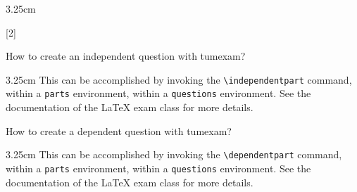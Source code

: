 \documentclass[english, @CLASSOPTIONS@]{tumexam}
\begin{document}
\begin{questions}
\begin{parts}
\begin{solutionbox}{3.25cm}
    \end{solutionbox}
  \end{parts}
  \clearpage
  [2]
  \begin{parts}
    \independentpart
    How to create an independent question with tumexam?
    \begin{solutionbox}{3.25cm}
      This can be accomplished by invoking the \texttt{\textbackslash{independentpart}} command, within a \texttt{parts} environment, within a \texttt{questions} environment. See the documentation of the \LaTeX{} exam class for more details.
    \end{solutionbox}
    \dependentpart
    How to create a dependent question with tumexam?
    \begin{solutionbox}{3.25cm}
      This can be accomplished by invoking the \texttt{\textbackslash{dependentpart}} command, within a \texttt{parts} environment, within a \texttt{questions} environment. See the documentation of the \LaTeX{} exam class for more details.
    \end{solutionbox}
  \end{parts}
  \clearpage
\end{questions}
\end{document}
